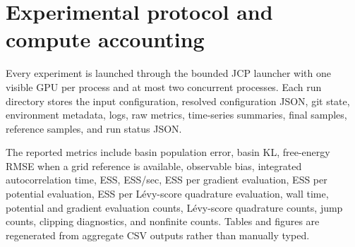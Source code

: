 \section{Experimental protocol and compute accounting}
Every experiment is launched through the bounded JCP launcher with one visible GPU per process and at most two concurrent processes. Each run directory stores the input configuration, resolved configuration JSON, git state, environment metadata, logs, raw metrics, time-series summaries, final samples, reference samples, and run status JSON.

The reported metrics include basin population error, basin KL, free-energy RMSE when a grid reference is available, observable bias, integrated autocorrelation time, ESS, ESS/sec, ESS per gradient evaluation, ESS per potential evaluation, ESS per L\'evy-score quadrature evaluation, wall time, potential and gradient evaluation counts, L\'evy-score quadrature counts, jump counts, clipping diagnostics, and nonfinite counts. Tables and figures are regenerated from aggregate CSV outputs rather than manually typed.
